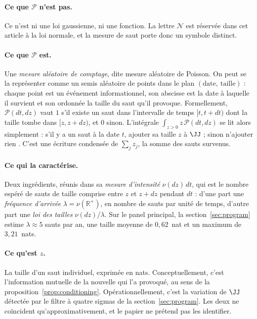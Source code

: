 \paragraph{Ce que $\mathcal{P}$ n'est pas.} Ce n'est ni une loi gaussienne, ni
une fonction. La lettre $\mathcal N$ est réservée dans cet article à la loi
normale, et la mesure de saut porte donc un symbole distinct.

\paragraph{Ce que $\mathcal{P}$ est.} Une \emph{mesure aléatoire de comptage},
dite mesure aléatoire de Poisson. On peut se la représenter comme un semis
aléatoire de points dans le plan $(\text{date},\ \text{taille})$ : chaque point
est un événement informationnel, son abscisse est la date à laquelle il survient
et son ordonnée la taille du saut qu'il provoque. Formellement,
$\mathcal{P}(dt,dz)$ vaut $1$ s'il existe un saut dans l'intervalle de temps
$[t,t+dt)$ dont la taille tombe dans $[z,z+dz)$, et $0$ sinon. L'intégrale
$\int_{z>0} z\,\mathcal{P}(dt,dz)$ se lit alors simplement : \og s'il y a un
saut à la date $t$, ajouter sa taille $z$ à $\JJ$ ; sinon n'ajouter rien \fg{}.
C'est une écriture condensée de $\sum_{j} z_j$, la somme des sauts survenus.

\paragraph{Ce qui la caractérise.} Deux ingrédients, réunis dans sa
\emph{mesure d'intensité} $\nu(dz)\,dt$, qui est le nombre espéré de sauts de
taille comprise entre $z$ et $z+dz$ pendant $dt$ : d'une part une
\emph{fréquence d'arrivée} $\lambda=\nu(\mathbb{R}^+)$, en nombre de sauts par
unité de temps, d'autre part une \emph{loi des tailles} $\nu(dz)/\lambda$. Sur
le panel principal, la section~\ref{sec:program} estime $\lambda\approx5$ sauts
par an, une taille moyenne de $0{,}62$~nat et un maximum de $3{,}21$~nats.

\paragraph{Ce qu'est $z$.} La taille d'un saut individuel, exprimée en nats.
Conceptuellement, c'est l'information mutuelle de la nouvelle qui l'a provoqué,
au sens de la proposition~\ref{prop:conditioning}. Opérationnellement, c'est la
variation de $\JJ$ détectée par le filtre à quatre sigmas de la
section~\ref{sec:program}. Les deux ne coïncident qu'approximativement, et le
papier ne prétend pas les identifier.

